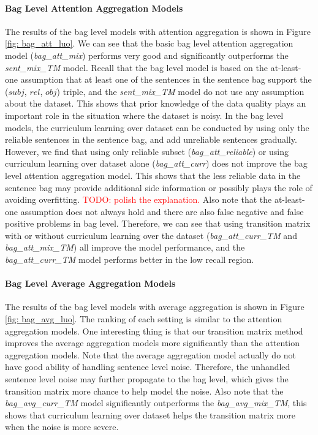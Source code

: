 \documentclass[11pt,a4paper]{article}
\newcommand{\todo}[1]{\textcolor{red}{TODO: #1}\PackageWarning{TODO:}{#1!}}
\begin{document}
\paragraph{Bag Level Attention Aggregation Models}
The results of the bag level models with attention aggregation is shown in Figure \ref{fig: bag_att_luo}. We can see that the basic bag level attention aggregation model (\emph{bag\_att\_mix}) performs very good and significantly outperforms the \emph{sent\_mix\_TM} model. Recall that the bag level model is based on the at-least-one assumption that at least one of the sentences in the sentence bag support the ($subj$, $rel$, $obj$) triple, and the \emph{sent\_mix\_TM} model do not use any assumption about the dataset. This shows that prior knowledge of the data quality plays an important role in the situation where the dataset is noisy. In the bag level models, the curriculum learning over dataset can be conducted by using only the reliable sentences in the sentence bag, and add unreliable sentences gradually. However, we find that using only reliable subset (\emph{bag\_att\_reliable}) or using curriculum learning over dataset alone (\emph{bag\_att\_curr}) does not improve the bag level attention aggregation model. This shows that the less reliable data in the sentence bag may provide additional side information or possibly plays the role of avoiding overfitting. \todo{polish the explanation.} Also note that the at-least-one assumption does not always hold and there are also false negative and false positive problems in bag level. Therefore, we can see that using transition matrix with or without curriculum learning over the dataset (\emph{bag\_att\_curr\_TM} and \emph{bag\_att\_mix\_TM}) all improve the model performance, and the \emph{bag\_att\_curr\_TM} model performs better in the low recall region.

\paragraph{Bag Level Average Aggregation Models}
The results of the bag level models with average aggregation is shown in Figure \ref{fig: bag_avg_luo}. The ranking of each setting is similar to the attention aggregation models. One interesting thing is that our transition matrix method improves the average aggregation models more significantly than the attention aggregation models. Note that the average aggregation model actually do not have good ability of handling sentence level noise. Therefore, the unhandled sentence level noise may further propagate to the bag level, which gives the transition matrix more chance to help model the noise. Also note that the \emph{bag\_avg\_curr\_TM} model significantly outperforms the \emph{bag\_avg\_mix\_TM}, this shows that curriculum learning over dataset helps the transition matrix more when the noise is more severe.
 
\end{document}
